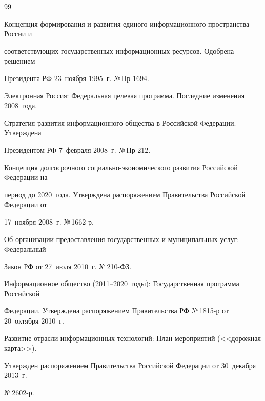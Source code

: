 {\small\frenchspacing

{%


\begin{thebibliography}{99}


Концепция формирования и развития единого информационного пространства России и

соответствующих государственных информационных ресурсов. Одобрена решением

Президента РФ 23~ноября 1995~г. №\,Пр-1694.


Электронная Россия: Федеральная целевая программа. Последние изменения 2008~года.


Стратегия развития информационного общества в Российской Федерации. Утверж\-де\-на

Президентом РФ 7~февраля 2008~г. №\,Пр-212.




Концепция долгосрочного социально-экономического развития Российской Федерации на

период до 2020~года. Утверждена распоряжением Правительства Российской Федерации от

17~ноября 2008~г. №\,1662-р.




Об организации предоставления государственных и муниципальных услуг: Федеральный

Закон РФ от 27~июля 2010~г. №\,210-ФЗ.




Информационное общество (2011--2020~годы): Государственная программа Российской

Федерации. Утверждена распоряжением Правительства РФ №\,1815-р от 20~октября 2010~г.




Развитие отрасли информационных технологий: План мероприятий (<<дорожная карта>>).

Утвержден распоряжением Правительства Российской Федерации от 30~декабря 2013~г.

№\,2602-р.




\end{thebibliography}}}
